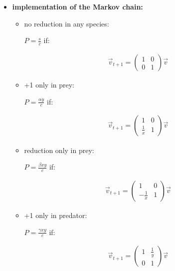 \documentclass[paper=a4, fontsize=11pt]{scrartcl} %
\numberwithin{equation}{section} %
\numberwithin{figure}{section} %
\numberwithin{table}{section} %
\begin{document}
\begin{itemize}
\item \textbf{implementation of the Markov chain:}


\begin{itemize}

\item no reduction in any species:

$P = \frac{s}{c}$ if:

\begin{equation}
\begin{split}
\vec{v}_{t+1} = \left(\begin{array}{cc} 1 & 0\\ 0 & 1 \end{array}\right) \vec{v}
\end{split}
\label{eq:predator_prey2}
\end{equation}

\item +1 only in prey:

$P = \frac{\alpha y}{c}$ if:

\begin{equation}
\begin{split}
\vec{v}_{t+1} = \left(\begin{array}{cc} 1 & 0\\ \frac{1}{x} & 1 \end{array}\right) \vec{v}
\end{split}
\label{eq:predator_prey3}
\end{equation}

\item reduction only in prey:

$P = \frac{\beta xy}{c}$ if:

\begin{equation}
\begin{split}
\vec{v}_{t+1} = \left(\begin{array}{cc} 1 & 0\\ -\frac{1}{x} & 1 \end{array}\right) \vec{v}
\end{split}
\label{eq:predator_prey4}
\end{equation}

\item +1 only in predator:

$P = \frac{\gamma xy}{c}$ if:

\begin{equation}
\begin{split}
\vec{v}_{t+1} = \left(\begin{array}{cc} 1 & \frac{1}{y}\\ 0 & 1 \end{array}\right) \vec{v}
\end{split}
\label{eq:predator_prey5}
\end{equation}


\end{itemize}
\end{itemize}
\end{document}
